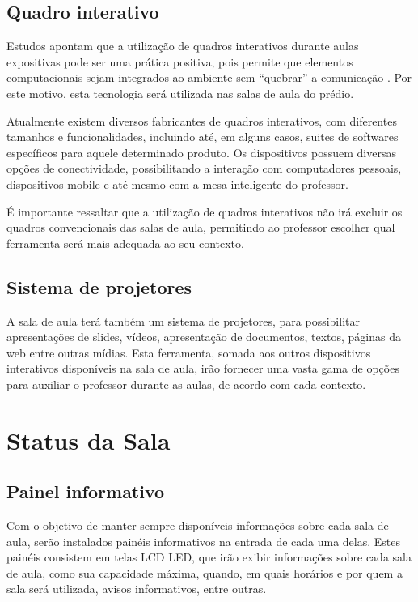 \subsection{Quadro interativo}
	Estudos apontam que a utilização de quadros interativos durante aulas expositivas pode ser uma prática positiva, pois permite que elementos computacionais sejam integrados ao ambiente sem “quebrar” a comunicação \cite{mech2007} \cite{gerard1999}. Por este motivo, esta tecnologia será  utilizada nas salas de aula do prédio.

Atualmente existem diversos fabricantes de quadros interativos, com diferentes tamanhos e funcionalidades, incluindo até, em alguns casos, suites de softwares específicos para aquele determinado produto. Os dispositivos possuem diversas opções de conectividade, possibilitando a interação com computadores pessoais, dispositivos mobile e até mesmo com a mesa inteligente do professor.

É importante ressaltar que a utilização de quadros interativos não irá excluir os quadros convencionais das salas de aula, permitindo ao professor escolher qual ferramenta será mais adequada ao seu contexto.

\subsection{Sistema de projetores}
A sala de aula terá também um sistema de projetores, para possibilitar apresentações de slides, vídeos, apresentação de documentos, textos, páginas da web entre outras mídias. Esta ferramenta, somada aos outros dispositivos interativos disponíveis na sala de aula, irão fornecer uma vasta gama de opções para auxiliar o professor durante as aulas, de acordo com cada contexto.

\section{Status da Sala}
\subsection{Painel informativo}
Com o objetivo de manter sempre disponíveis informações sobre cada sala de aula, serão instalados painéis informativos na entrada de cada uma delas. Estes painéis consistem em telas LCD LED, que irão exibir informações sobre cada sala de aula, como sua capacidade máxima, quando, em quais horários e por quem a sala será utilizada, avisos informativos, entre outras.

